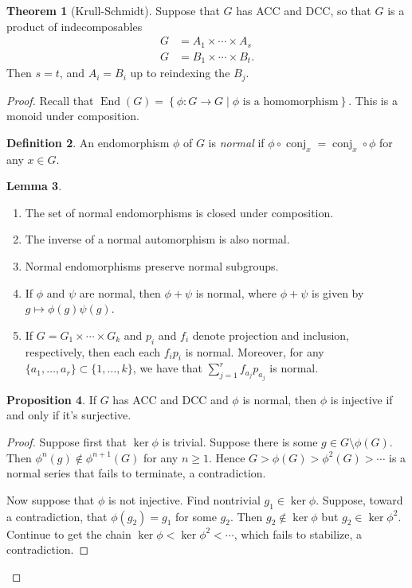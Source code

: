 \documentclass[10pt,letterpaper,cm]{nupset}
\theoremstyle{definition}
\newtheorem{definition}{Definition}[subsection]
\theoremstyle{theorem}
\newtheorem{theorem}[definition]{Theorem}
\newtheorem{lemma}[definition]{Lemma}
\newtheorem{prop}[definition]{Proposition}
\theoremstyle{remark}
\newcommand{\1}{\mathbf{1}}
\newcommand{\0}{\vec 0}
\newcommand{\dcc}{\textsf{DCC}\xspace}
\newcommand{\acc}{\textsf{ACC}\xspace}
\DeclareMathOperator{\ed}{End}
\DeclareMathOperator{\conj}{conj}
\begin{document}
\begin{theorem}[Krull-Schmidt]
Suppose that $G$ has \acc and \dcc, so that $G$ is a product of indecomposables \begin{align*}
G &  = A_1 \times \cdots \times A_s \\ G & = B_1 \times \cdots \times B_t.
\end{align*} Then $s=t$, and $A_i = B_i$ up to reindexing the $B_j$.
\end{theorem}
\begin{proof}
Recall that $\ed(G) = \left\{\phi : G \to G \mid \phi \text{ is a homomorphism}\right\}$. This is a monoid under composition.
\begin{definition}
An endomorphism $\phi$ of $G$ is \textit{normal} if $\phi \circ \conj_x = \conj_x \circ \phi$ for any $x\in G$.
\end{definition}
\begin{lemma} $ $
\begin{enumerate}
\item The set of normal endomorphisms is closed under composition.
\item The inverse of a normal automorphism is also normal.
\item Normal endomorphisms preserve normal subgroups.
\item If $\phi$ and $\psi$ are normal, then $\phi + \psi$ is normal, where $\phi + \psi$ is given by $g\mapsto \phi(g)\psi(g)$.
\item If $G = G_1 \times \cdots \times G_k$ and $p_i$ and $f_i$ denote projection and inclusion, respectively, then each each $f_ip_i$ is normal. Moreover, for any $\{a_1, \ldots, a_r\} \subset \{1, \ldots, k\}$, we have that $\sum_{j=1}^r f_{a_j}p_{a_j}$ is normal.
\end{enumerate}
\end{lemma}
\begin{prop}
If $G$ has \acc and \dcc and $\phi$ is normal, then $\phi$ is injective if and only if it's surjective.
\end{prop}
\begin{proof}
Suppose first that $\ker{\phi}$ is trivial. Suppose there is some $g \in G \setminus \phi(G)$.  Then $\phi^n(g) \notin \phi^{n+1}(G)$ for any $n \geq 1$. Hence $G > \phi(G) > \phi^2(G) > \cdots$ is a normal series that fails to terminate, a contradiction. 
\medskip

 Now suppose that $\phi$ is not injective. Find nontrivial $g_1 \in \ker{\phi}$. Suppose, toward a contradiction, that $\phi(g_2) = g_1$ for some $g_2$. Then $g_2 \notin \ker{\phi}$ but $g_2 \in \ker{\phi^2}$. Continue to get the chain $\ker{\phi} < \ker{\phi^2} < \cdots$, which fails to stabilize, a contradiction. 
\end{proof}


\end{proof}
\end{document}
